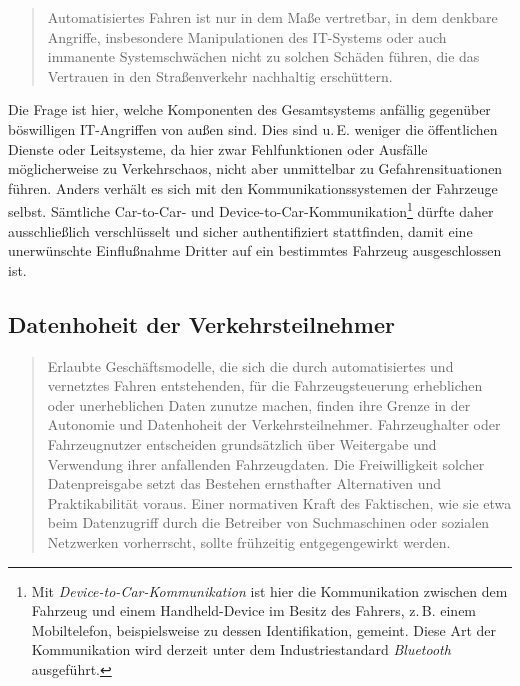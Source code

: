 \documentclass[twoside,a4paper,12pt]{article}
\begin{document}
\begin{quote}
\glqq
Automatisiertes Fahren ist nur in dem Maße vertretbar, in dem denkbare Angriffe, insbesondere Manipulationen des 
IT-Systems oder auch immanente Systemschwächen nicht
zu solchen Schäden führen, die das Vertrauen in den Straßenverkehr nachhaltig erschüttern.\grqq\mbox{~\cite[S. 12]{ek}}
\end{quote}

Die Frage ist hier, welche Komponenten des Gesamtsystems anfällig gegenüber böswilligen IT-Angriffen von außen sind. Dies sind u.\,E. weniger 
die öffentlichen Dienste oder Leitsysteme, da hier zwar Fehlfunktionen oder Ausfälle möglicherweise zu Verkehrschaos, nicht aber unmittelbar zu 
Gefahrensituationen führen. Anders verhält es sich
mit den Kommunikationssystemen der Fahrzeuge selbst. Sämtliche Car-to-Car- und Device-to-Car-Kommunikation\footnote{Mit \textit{Device-to-Car-Kommunikation} 
ist hier die Kommunikation zwischen dem Fahrzeug und einem Handheld-Device im Besitz des Fahrers, z.\,B. einem Mobiltelefon, beispielsweise zu dessen
Identifikation, gemeint. Diese Art der Kommunikation wird derzeit unter dem Industriestandard \textit{Bluetooth}~\cite{bt} ausgeführt.} dürfte daher ausschließlich verschlüsselt 
und sicher authentifiziert stattfinden, damit eine unerwünschte Einflußnahme Dritter auf ein bestimmtes Fahrzeug ausgeschlossen ist.

\subsection{Datenhoheit der Verkehrsteilnehmer} \label{DatenhoheitDerVerkehrsteilnehmer}

\begin{quote}
\glqq
Erlaubte Geschäftsmodelle, die sich die durch automatisiertes und vernetztes Fahren entstehenden, für die Fahrzeugsteuerung 
erheblichen oder unerheblichen Daten zunutze
machen, finden ihre Grenze in der Autonomie und Datenhoheit der Verkehrsteilnehmer.
Fahrzeughalter oder Fahrzeugnutzer entscheiden grundsätzlich über Weitergabe und
Verwendung ihrer anfallenden Fahrzeugdaten. Die Freiwilligkeit solcher Datenpreisgabe
setzt das Bestehen ernsthafter Alternativen und Praktikabilität voraus. Einer normativen
Kraft des Faktischen, wie sie etwa beim Datenzugriff durch die Betreiber von Suchmaschinen oder sozialen Netzwerken vorherrscht, 
sollte frühzeitig entgegengewirkt werden.\grqq\mbox{~\cite[S. 12]{ek}}
\end{quote}
\end{document}
